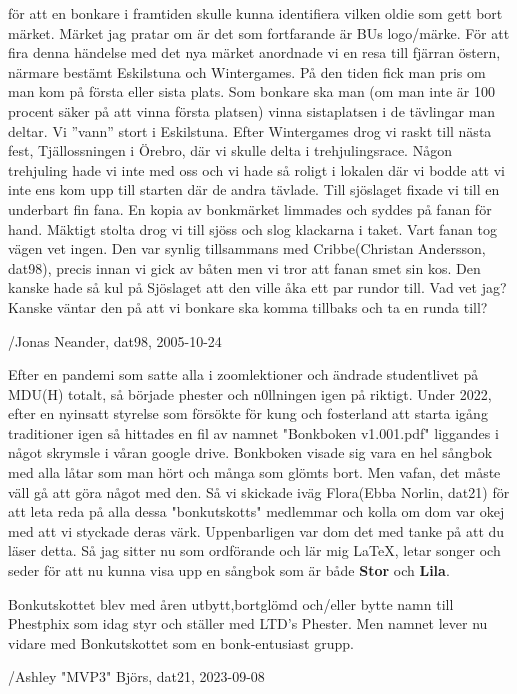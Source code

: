 för att en bonkare i framtiden skulle kunna identifiera vilken oldie som gett bort märket. Märket jag pratar om är det som fortfarande är BUs logo/märke. För att fira denna händelse med det nya märket anordnade vi en resa till fjärran östern, närmare bestämt Eskilstuna och Wintergames. På den tiden fick man pris om man kom på första eller sista plats. Som bonkare ska man (om man inte är 100 procent säker på att vinna första platsen) vinna sistaplatsen i de tävlingar man deltar. Vi ”vann” stort i Eskilstuna. Efter Wintergames drog vi raskt till nästa fest, Tjällossningen i Örebro, där vi skulle delta i trehjulingsrace. Någon trehjuling hade vi inte med oss och vi hade så roligt i lokalen där vi bodde att vi inte ens kom upp till starten där de andra tävlade. Till sjöslaget fixade vi till en underbart fin fana. En kopia av bonkmärket limmades och syddes på fanan för hand. Mäktigt stolta drog vi till sjöss och slog klackarna i taket. Vart fanan tog vägen vet ingen. Den var synlig tillsammans med Cribbe(Christan Andersson, dat98), precis innan vi gick av båten men vi tror att fanan smet sin kos. Den kanske hade så kul på Sjöslaget att den ville åka ett par rundor till. Vad vet jag? Kanske väntar den på att vi bonkare ska komma tillbaks och ta en runda till? 

/Jonas Neander, dat98, 2005-10-24

Efter en pandemi som satte alla i zoomlektioner och ändrade studentlivet på MDU(H) totalt, så började phester och n0llningen igen på riktigt. Under 2022, efter en nyinsatt styrelse som försökte för kung och fosterland att starta igång traditioner igen så hittades en fil av namnet "Bonkboken v1.001.pdf" liggandes i något skrymsle i våran google drive. Bonkboken visade sig vara en hel sångbok med alla låtar som man hört och många som glömts bort. Men vafan, det måste väll gå att göra något med den. Så vi skickade iväg Flora(Ebba Norlin, dat21) för att leta reda på alla dessa "bonkutskotts" medlemmar och kolla om dom var okej med att vi styckade deras värk. Uppenbarligen var dom det med tanke på att du läser detta. Så jag sitter nu som ordförande och lär mig LaTeX, letar songer och seder för att nu kunna visa upp en sångbok som är både \textbf{Stor} och \textbf{Lila}. 

Bonkutskottet blev med åren utbytt,bortglömd och/eller bytte namn till Phestphix som idag styr och ställer med LTD's Phester. Men namnet lever nu vidare med Bonkutskottet som en bonk-entusiast grupp.

/Ashley "MVP3" Björs, dat21, 2023-09-08\newpage


